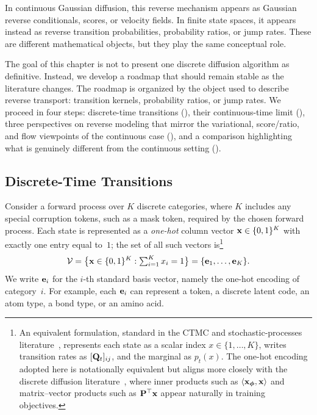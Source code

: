 
In continuous Gaussian diffusion, this reverse mechanism appears as Gaussian
reverse conditionals, scores, or velocity fields. In finite state spaces, it
appears instead as reverse transition probabilities, probability ratios, or jump
rates. These are different mathematical objects, but they play the same
conceptual role.

The goal of this chapter is not to present one discrete diffusion algorithm as
definitive. Instead, we develop a roadmap that should remain stable as the
literature changes. The roadmap is organized by the object used to describe
reverse transport: transition kernels, probability ratios, or jump rates. We
proceed in four steps: discrete-time transitions (),
their continuous-time limit (), three perspectives on
reverse modeling that mirror the variational, score/ratio, and flow viewpoints
of the continuous case (), and a comparison
highlighting what is genuinely different from the continuous setting
().

\subsection{Discrete-Time Transitions}
\label{subsec:epilogue-dtmc}

Consider a forward process over $K$ discrete categories, where $K$
includes any special corruption tokens, such as a mask token, required
by the chosen forward process.  Each state is represented as a
\emph{one-hot} column vector ${\mathbf{x}}\in\{0,1\}^{K}$ with exactly one
entry equal to~$1$; the set of all such vectors
is\footnote{An equivalent formulation, standard in the CTMC and
stochastic-processes
literature~\citep{norris1998markov,kelly1979reversibility}, represents
each state as a scalar index $x\in\{1,\dots,K\}$, writes transition
rates as $[{\mathbf{Q}}_t]_{ij}$, and the marginal as $p_t(x)$.  The one-hot
encoding adopted here is notationally equivalent but aligns more closely
with the discrete diffusion
literature~\citep{austin2021structured,sahoo2024simple,lou2024discrete},
where inner products such as $\langle{\mathbf{x}}_{{\bm{\phi}}},{\mathbf{x}}\rangle$ and
matrix--vector products such as ${\mathbf{P}}^{\top}{\mathbf{x}}$ appear naturally in
training objectives.}
\[
\mathcal{V}
= \bigl\{{\mathbf{x}}\in\{0,1\}^{K}:\textstyle\sum_{i=1}^{K}x_i=1\bigr\}
= \{{\mathbf{e}}_1,\ldots,{\mathbf{e}}_K\}.
\]
We write ${\mathbf{e}}_i$ for the $i$-th standard basis vector, namely the one-hot
encoding of category~$i$.  For example, each ${\mathbf{e}}_i$ can represent
a token, a discrete latent code, an atom type, a bond type, or an amino acid.

